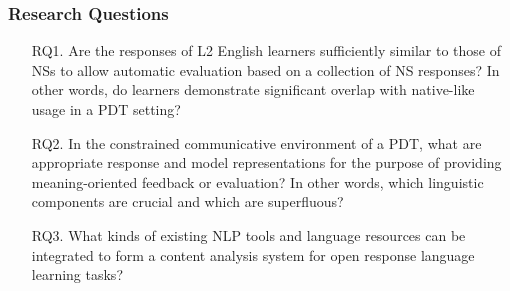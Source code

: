 \documentclass[handout,xcolor={dvipsnames}]{beamer}
\begin{document}
\begin{frame}
\frametitle{Research Questions}
\small
\pause
\begin{itemize}
\pause
\vspace{2em}
\item[RQ1.]{Are the responses of L2 English learners sufficiently similar to those of NSs to allow automatic evaluation based on a collection of NS responses? In other words, do learners demonstrate significant overlap with native-like usage in a PDT setting?} %
\vspace{2em}
\pause
\item[RQ2.]{In the constrained communicative environment of a PDT, what are appropriate response and model representations for the purpose of providing meaning-oriented feedback or evaluation? In other words, which linguistic components are crucial and which are superfluous?}

\pause
\vspace{2em}
\item[RQ3.]{What kinds of existing NLP tools and language resources can be integrated to form a content analysis system for open response language learning tasks?}
\end{itemize}
\end{frame}
\end{document}
